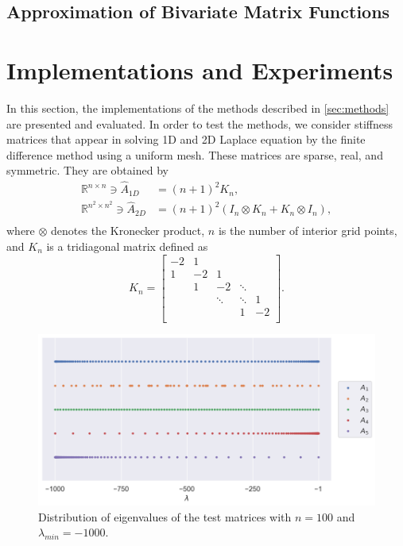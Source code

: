 \subsection{Approximation of Bivariate Matrix Functions}\label{sec:krylovmethodbivariate}

\section{Implementations and Experiments}

In this section, the implementations of the methods described in \autoref{sec:methods} are presented and evaluated.
In order to test the methods, we consider stiffness matrices that appear in solving 1D and 2D Laplace equation by the finite
difference method using a uniform mesh. These matrices are sparse, real, and symmetric. They are obtained by
\begin{equation*}
    \begin{aligned}
        \mathbb{R}^{n \times n} \ni \hat{A}_{1D} & = (n+1)^2 K_n,\\
        \mathbb{R}^{n^2 \times n^2} \ni \hat{A}_{2D} & = (n+1)^2  (I_n \otimes K_n + K_n \otimes I_n),\\
        \end{aligned}
\end{equation*}
where $\otimes$ denotes the Kronecker product, $n$ is the number of interior grid points, and $K_n$ is a tridiagonal
matrix defined as
\begin{equation*}
    K_n =
    \begin{bmatrix}
        -2 & 1 &  &  &  \\
        1 & -2 & 1 &  &  \\
         & 1 & -2 & \ddots &  \\
         &  & \ddots & \ddots & 1 \\
         &  &  & 1 & -2  \\
    \end{bmatrix}.
\end{equation*}

\begin{figure}[t!]
    \centering
    \includegraphics[width=.8\textwidth]{img/eigvals.png}
    \caption{Distribution of eigenvalues of the test matrices with $n=100$ and $\lambda_{min} = -1000$.}
    \label{fig:eigenvaluedistributions}
\end{figure}

